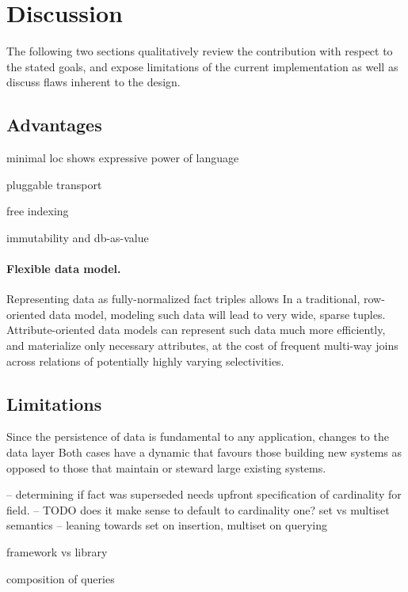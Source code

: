\cleardoublepage
\section{Discussion}\label{sec:discussion}

The following two sections qualitatively review the contribution with respect to the stated goals, and expose limitations of the current implementation as well as discuss flaws inherent to the design.

\subsection{Advantages}

minimal loc shows expressive power of language

pluggable transport

free indexing

immutability and db-as-value

\paragraph{Flexible data model.} Representing data as fully-normalized fact triples allows
In a traditional, row-oriented data model, modeling such data will lead to very wide, sparse tuples. Attribute-oriented data models can represent such data much more efficiently, and materialize only necessary attributes, at the cost of frequent multi-way joins across relations of potentially highly varying selectivities. \cite{gobel2019optimising}


\subsection{Limitations}



Since the persistence of data is fundamental to any application, changes to the data layer
Both cases have a dynamic that favours those building new systems as opposed to those that maintain or steward large existing systems.

-- determining if fact was superseded needs upfront specification of cardinality for field.
-- TODO does it make sense to default to cardinality one?
set vs multiset semantics -- leaning towards set on insertion, multiset on querying



framework vs library

composition of queries

